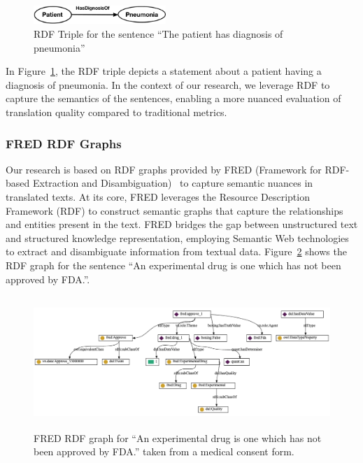 \documentclass[runningheads]{llncs}
\begin{document}
\begin{figure}[h]
  \centering
  \includegraphics[height=0.7cm,width=0.45\linewidth]{figures/rdftriple.jpg}
  \caption{RDF Triple for the sentence ``The patient has diagnosis of pneumonia''}
  \label{rdffigure}
\end{figure}

In Figure~\ref{rdffigure}, the RDF triple depicts a statement about a patient having a diagnosis of pneumonia. In the context of our research, we leverage RDF to capture the semantics of the sentences, enabling a more nuanced evaluation of translation quality compared to traditional metrics.

\subsubsection{FRED RDF Graphs}

Our research is based on RDF graphs provided by FRED (Framework for RDF-based Extraction and Disambiguation)~\cite{fredPaper} to capture semantic nuances in translated texts. At its core, FRED leverages the Resource Description Framework (RDF) to construct semantic graphs that capture the relationships and entities present in the text. FRED bridges the gap between unstructured text and structured knowledge representation, employing Semantic Web technologies to extract and disambiguate information from textual data. Figure~\ref{fdadrug} shows the RDF graph for the sentence ``An experimental drug is one which has not been approved by FDA.''.


\begin{figure}[h]
  \centering
  \includegraphics[height=5cm, width=1\linewidth]{figures/rdf-fda.png}
  \caption{FRED RDF graph for “An experimental drug is one which has not been approved by FDA.” taken from a medical consent form.}
  \label{fdadrug}
\end{figure}
\end{document}
